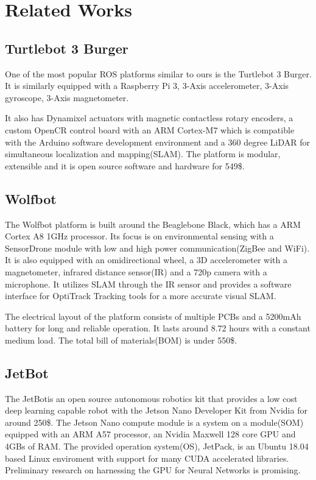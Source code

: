 \documentclass[class=article, crop=false]{standalone}
\begin{document}
\chapter{Related Works}\label{cha:related-works}

\section{Turtlebot 3 Burger}\label{sec:turtlebot3burger}
One of the most popular ROS platforms similar to ours is the Turtlebot 3 Burger\footnotemark. It is similarly equipped with a Raspberry Pi 3, 3-Axis accelerometer, 3-Axis gyroscope, 3-Axis magnetometer.

It also has Dynamixel actuators with magnetic contactless rotary encoders, a custom OpenCR control board with an ARM Cortex-M7 which is compatible with the Arduino software development environment and a 360 degree LiDAR for simultaneous localization and mapping(SLAM).
The platform is modular, extensible and it is open source software and hardware for 549\$\cite{turtlebot3}.


\section{Wolfbot}\label{sec:wolfbot}
The Wolfbot\cite{wolfbot} platform is built around the Beaglebone Black, which has a ARM Cortex A8 1GHz processor. Its focus is on environmental sensing with a SensorDrone module with low and high power communication(ZigBee and WiFi). It is also equipped with an omidirectional wheel, a 3D accelerometer with a magnetometer, infrared distance sensor(IR) and a 720p camera with a microphone. It utilizes SLAM through the IR sensor and provides a software interface for OptiTrack Tracking tools for a more accurate visual SLAM.

The electrical layout of the platform consists of multiple PCBs and a 5200mAh battery for long and reliable operation. It lasts around 8.72 hours with a constant medium load. The total bill of materials(BOM) is under 550\$.

\section{JetBot}\label{sec:jetbot}
The JetBot\footnotemark is an open source autonomous robotics kit that provides a low cost deep learning capable robot with the Jetson Nano Developer Kit from Nvidia for around 250\$.
\indent
The Jetson Nano compute module is a system on a module(SOM) equipped with an ARM A57 processor, an Nvidia Maxwell 128 core GPU and 4GBs of RAM. The provided operation system(OS), JetPack, is an Ubuntu 18.04 based Linux enviroment with support for many CUDA accelerated libraries. Preliminary research on harnessing the GPU for Neural Networks is promising\cite{hubbard2019}.
\end{document}
